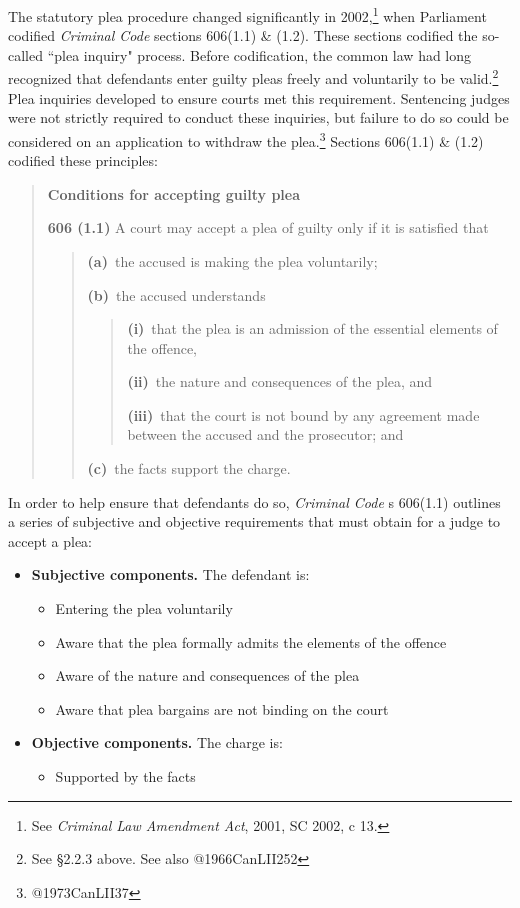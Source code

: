 The statutory plea procedure changed significantly in 2002,\footnote{See \textit{Criminal Law Amendment Act}, 2001, SC 2002, c 13.} when Parliament codified \textit{Criminal Code} sections 606(1.1) \& (1.2). These sections codified the so-called ``plea inquiry" process. Before codification, the common law had long recognized that defendants enter guilty pleas freely and voluntarily to be valid.\footnote{See §2.2.3 above. See also @1966CanLII252} Plea inquiries developed to ensure courts met this requirement. Sentencing judges were not strictly required to conduct these inquiries, but failure to do so could be considered on an application to withdraw the plea.\footnote{@1973CanLII37} Sections 606(1.1) \& (1.2) codified these principles:

\begin{quote}
    \singlespacing
    \textbf{Conditions for accepting guilty plea}
    
    \textbf{606 (1.1)} A court may accept a plea of guilty only if it is satisfied that

    \begin{quote}
        \textbf{(a)} the accused is making the plea voluntarily;
        
        \textbf{(b)} the accused understands
        \begin{quote}
            \textbf{(i)} that the plea is an admission of the essential elements of the offence,
            
            \textbf{(ii)} the nature and consequences of the plea, and
            
            \textbf{(iii)} that the court is not bound by any agreement made between the accused and the prosecutor; and   
        \end{quote}
        \textbf{(c)} the facts support the charge.
    \end{quote}

\end{quote}

In order to help ensure that defendants do so, \textit{Criminal Code} s 606(1.1) outlines a series of subjective and objective requirements that must obtain for a judge to accept a plea:

\begin{itemize}
    \item \textbf{Subjective components.} The defendant is:
    \begin{itemize}
        \item Entering the plea voluntarily
        \item Aware that the plea formally admits the elements of the offence
        \item Aware of the nature and consequences of the plea
        \item Aware that plea bargains are not binding on the court
    \end{itemize}
    \item \textbf{Objective components.} The charge is:
    \begin{itemize}
        \item Supported by the facts
    \end{itemize}
\end{itemize}

